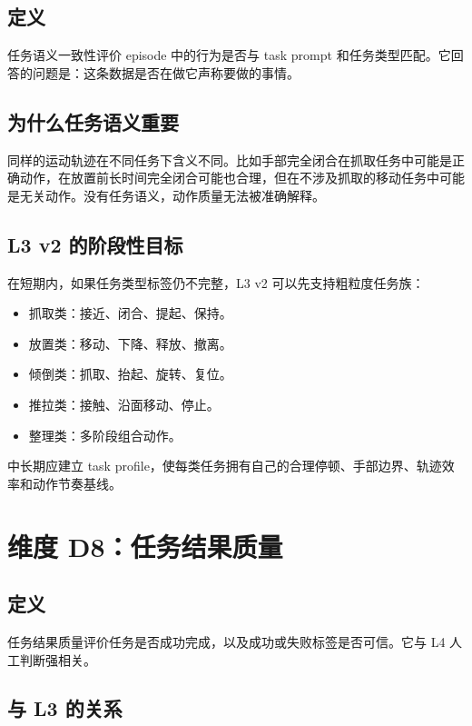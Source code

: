 \documentclass[UTF8,zihao=-4]{ctexart}
\begin{document}
\subsection{定义}

任务语义一致性评价 episode 中的行为是否与 task prompt 和任务类型匹配。它回答的问题是：这条数据是否在做它声称要做的事情。

\subsection{为什么任务语义重要}

同样的运动轨迹在不同任务下含义不同。比如手部完全闭合在抓取任务中可能是正确动作，在放置前长时间完全闭合可能也合理，但在不涉及抓取的移动任务中可能是无关动作。没有任务语义，动作质量无法被准确解释。

\subsection{L3 v2 的阶段性目标}

在短期内，如果任务类型标签仍不完整，L3 v2 可以先支持粗粒度任务族：

\begin{itemize}
  \item 抓取类：接近、闭合、提起、保持。
  \item 放置类：移动、下降、释放、撤离。
  \item 倾倒类：抓取、抬起、旋转、复位。
  \item 推拉类：接触、沿面移动、停止。
  \item 整理类：多阶段组合动作。
\end{itemize}

中长期应建立 task profile，使每类任务拥有自己的合理停顿、手部边界、轨迹效率和动作节奏基线。

\section{维度 D8：任务结果质量}

\subsection{定义}

任务结果质量评价任务是否成功完成，以及成功或失败标签是否可信。它与 L4 人工判断强相关。

\subsection{与 L3 的关系}
\end{document}

